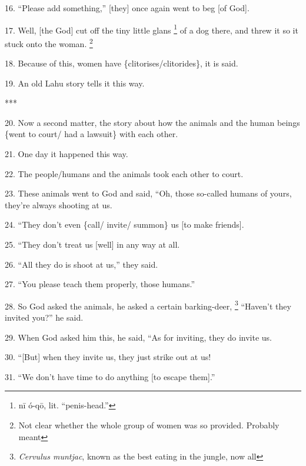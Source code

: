 16. ``Please add something,'' [they] once again went to beg [of God].

17. Well, [the God] cut off the tiny little glans \footnote{nī ó-qō, lit. ``penis-head.''} of a dog there, and threw
it so it stuck onto the woman. \footnote{Not clear whether the whole group of women was so provided. Probably meant}

18. Because of this, women have \{clitorises/clitorides\}, it is said.

19. An old Lahu story tells it this way.

***

20. Now a second matter, the story about how the animals and the human beings \{went
to court/ had a lawsuit\} with each other.

21. One day it happened this way.

22. The people/humans and the animals took each other to court.

23. These animals went to God and said, ``Oh, those so-called humans of yours,
they're always shooting at us.

24. ``They don't even \{call/ invite/ summon\} us [to make friends].

25. ``They don't treat us [well] in any way at all.

26. ``All they do is shoot at us,'' they said.

27. ``You please teach them properly, those humans.''

28. So God asked the animals, he asked a certain barking-deer, \footnote{\textit{Cervulus muntjac}, known as the best eating in the jungle, now all} ``Haven't they
invited you?'' he said.

29. When God asked him this, he said, ``As for inviting, they do invite us.

30. ``[But] when they invite us, they just strike out at us!

31. ``We don't have time to do anything [to escape them].''

